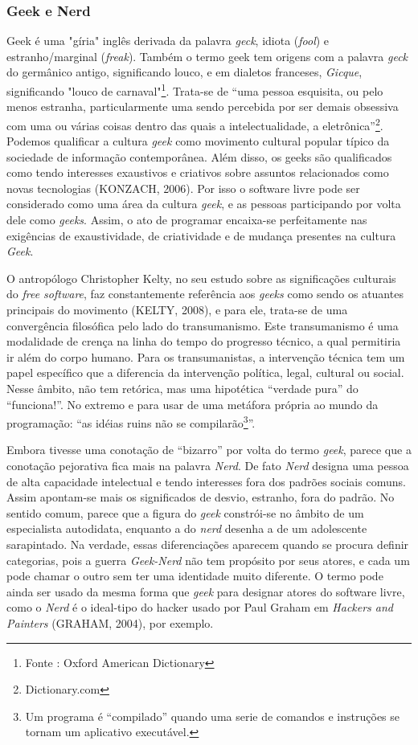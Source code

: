\subsubsection{Geek e Nerd} \label{2.1.1.b}

Geek é uma "gíria" inglês derivada da palavra \emph{geck}, idiota (\emph{fool}) e estranho/marginal (\emph{freak}). Também o termo geek tem origens com a palavra \emph{geck} do germânico antigo, significando louco, e em dialetos franceses, \emph{Gicque}, significando "louco de carnaval"\footnote{Fonte : Oxford American Dictionary}. Trata-se de “uma pessoa esquisita, ou pelo menos estranha, particularmente uma sendo percebida por ser demais obsessiva com uma ou várias coisas dentro das quais a intelectualidade, a eletrônica”\footnote{Dictionary.com}.  Podemos qualificar a cultura \emph{geek} como movimento cultural popular típico da sociedade de informação contemporânea. Além disso, os geeks são qualificados como tendo interesses exaustivos e criativos sobre assuntos relacionados como novas tecnologias (KONZACH, 2006). Por isso o software livre pode ser considerado como uma área da cultura \emph{geek}, e as pessoas participando por volta dele como \emph{geeks}. Assim, o ato de programar encaixa-se perfeitamente nas exigências de exaustividade, de criatividade e de mudança presentes na cultura \emph{Geek}. 

O antropólogo Christopher Kelty, no seu estudo sobre as significações culturais do \emph{free software}, faz constantemente referência aos \emph{geeks} como sendo os atuantes principais do movimento (KELTY, 2008), e para ele, trata-se de uma convergência filosófica pelo lado do transumanismo. Este transumanismo é uma modalidade de crença na linha do tempo do progresso técnico, a qual permitiria ir além do corpo humano. Para os transumanistas, a intervenção técnica tem um papel específico que a diferencia da intervenção política, legal, cultural ou social. Nesse âmbito, não tem retórica, mas uma hipotética “verdade pura” do “funciona!”. No extremo e para usar de uma metáfora própria ao mundo da programação: “as idéias ruins não se compilarão\footnote{Um programa é  “compilado” quando uma serie de comandos e instruções se tornam um aplicativo executável.}”.

Embora tivesse uma conotação de “bizarro” por volta do termo \emph{geek}, parece que a conotação pejorativa fica mais na palavra \emph{Nerd}. De fato \emph{Nerd} designa uma pessoa de alta capacidade intelectual e tendo interesses fora dos padrões sociais comuns. Assim apontam-se mais os significados de desvio, estranho, fora do padrão. No sentido comum, parece que a figura do \emph{geek} constrói-se no âmbito de um especialista autodidata, enquanto a do \emph{nerd} desenha a de um adolescente sarapintado.  Na verdade, essas diferenciações aparecem quando se procura definir categorias, pois a guerra \emph{Geek-Nerd} não tem propósito por seus atores, e cada um pode chamar o outro sem ter uma identidade muito diferente. O termo pode ainda ser usado da mesma forma que \emph{geek} para designar atores do software livre, como o \emph{Nerd} é o ideal-tipo do hacker usado por Paul Graham em \emph{Hackers and Painters} (GRAHAM, 2004), por exemplo.


